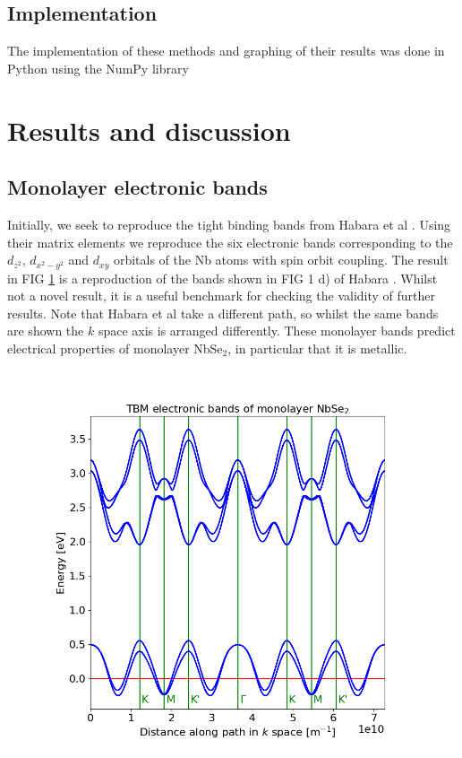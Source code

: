\documentclass[12pt]{report} %
\begin{document}
\subsection*{Implementation}
The implementation of these methods and graphing of their results was done in Python using the NumPy library

\section*{Results and discussion}

\subsection*{Monolayer electronic bands}
Initially, we seek to reproduce the tight binding bands from Habara et al \cite{Habara2021}. Using their matrix elements we reproduce the six electronic bands corresponding to the $d_{z^2}$, $d_{x^2 - y^2}$ and $d_{xy}$ orbitals of the Nb atoms with spin orbit coupling. The result in FIG \ref{monolayer_bands} is a reproduction of the bands shown in FIG 1 d) of Habara \cite{Habara2021}. Whilst not a novel result, it is a useful benchmark for checking the validity of further results. Note that Habara et al take a different path, so whilst the same bands are shown the $k$ space axis is arranged differently. These monolayer bands predict electrical properties of monolayer NbSe$_2$, in particular that it is metallic.

\begin{figure}[t!]
\centering
  \includegraphics[width=0.6\columnwidth]{monolayer_bands.png}
  \caption{
  }
  \label{monolayer_bands}
\end{figure}
\end{document}
